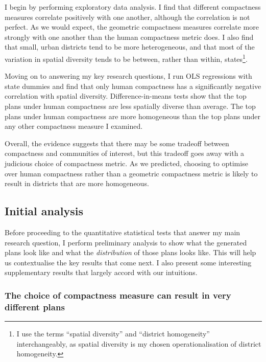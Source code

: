 \documentclass[]{article}
\begin{document}
I begin by performing exploratory data analysis. I find that different
compactness measures correlate positively with one another, although the
correlation is not perfect. As we would expect, the geometric
compactness measures correlate more strongly with one another than the
human compactness metric does. I also find that small, urban districts
tend to be more heterogeneous, and that most of the variation in spatial
diversity tends to be between, rather than within, states\footnote{I use
  the terms ``spatial diversity'' and ``district homogeneity''
  interchangeably, as spatial diversity is my chosen operationalisation
  of district homogeneity.}.

Moving on to answering my key research questions, I run OLS regressions
with state dummies and find that only human compactness has a
significantly negative correlation with spatial diversity.
Difference-in-means tests show that the top plans under human
compactness are less spatially diverse than average. The top plans under
human compactness are more homogeneous than the top plans under any
other compactness measure I examined.

Overall, the evidence suggests that there may be some tradeoff between
compactness and communities of interest, but this tradeoff goes away
with a judicious choice of compactness metric. As we predicted, choosing
to optimise over human compactness rather than a geometric compactness
metric is likely to result in districts that are more homogeneous.

\hypertarget{initial-analysis}{%
\subsection{Initial analysis}\label{initial-analysis}}

Before proceeding to the quantitative statistical tests that answer my
main research question, I perform preliminary analysis to show what the
generated plans look like and what the \emph{distribution} of those
plans looks like. This will help us contextualise the key results that
come next. I also present some interesting supplementary results that
largely accord with our intuitions.

\hypertarget{the-choice-of-compactness-measure-can-result-in-very-different-plans}{%
\subsubsection{The choice of compactness measure can result in very
different
plans}\label{the-choice-of-compactness-measure-can-result-in-very-different-plans}}
\end{document}
